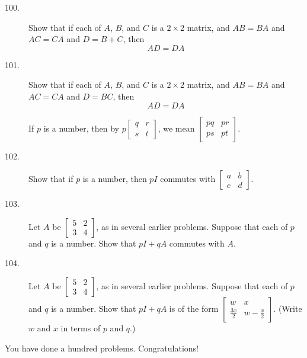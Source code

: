 \documentclass{article}
\begin{document}
\begin{description}
  \item[100.] Show that if each of $A$, $B$, and $C$ is a $2 \times 2$ matrix, and $AB = BA$ and $AC = CA$ and $D = B + C$, then
    \begin{equation*}
    AD = DA
    \end{equation*}

  \item[101.] Show that if each of $A$, $B$, and $C$ is a $2 \times 2$ matrix, and $AB = BA$ and $AC = CA$ and $D = BC$, then
    \begin{equation*}
    AD = DA
    \end{equation*}

  \item[] If $p$ is a number, then by $p \begin{bmatrix} q & r \\ s & t \end{bmatrix}$, we mean $\begin{bmatrix} pq & pr \\ ps & pt \end{bmatrix}$.

  \item[102.] Show that if $p$ is a number, then $pI$ commutes with $\begin{bmatrix} a & b \\ c & d \end{bmatrix}$.

  \item[103.] Let $A$ be $\begin{bmatrix} 5 & 2 \\ 3 & 4 \end{bmatrix}$, as in several earlier problems. Suppose that each of $p$ and $q$ is a number. Show that $pI + qA$ commutes with $A$.

  \item[104.] Let $A$ be $\begin{bmatrix} 5 & 2 \\ 3 & 4 \end{bmatrix}$, as in several earlier problems. Suppose that each of $p$ and $q$ is a number. Show that $pI + qA$ is of the form $\begin{bmatrix} w & x \\ \frac{3x}{2} & w-\frac{x}{2} \end{bmatrix}$. (Write $w$ and $x$ in terms of $p$ and $q$.)

\end{description}

You have done a hundred problems. Congratulations!
\end{document}
